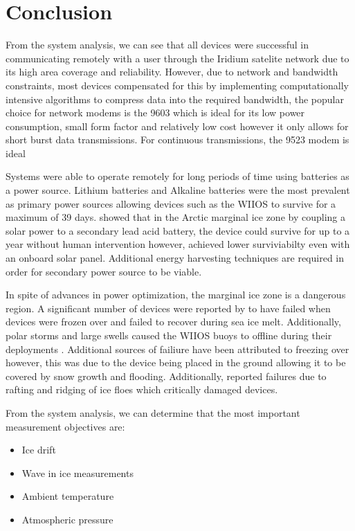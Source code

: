  
\section{Conclusion}

From the system analysis, we can see that all devices were successful in communicating remotely with a user through the Iridium satelite network due to its high area coverage and reliability. However, due to network and bandwidth constraints, most devices compensated for this by implementing computationally intensive algorithms to compress data into the required bandwidth, the popular choice for network modems is the 9603 which is ideal for its low power consumption, small form factor and relatively low cost however it only allows for short burst data transmissions. For continuous transmissions, the 9523 modem is ideal \par 

Systems were able to operate remotely for long periods of time using batteries as a power source. Lithium batteries and Alkaline batteries were the most prevalent as primary power sources allowing devices such as the WIIOS to survive for a maximum of 39 days. \textcite{doble2017robust} showed that in the Arctic marginal ice zone by coupling a solar power to a secondary lead acid battery, the device could survive for up to a year without human intervention however, \textcite{rabault2020development} achieved lower surviviabilty even with an onboard solar panel. Additional energy harvesting techniques are required in order for secondary power source to be viable. \par 

In spite of advances in power optimization, the marginal ice zone is a dangerous region. A significant number of devices were reported by \textcite{doble2017robust} to have failed when devices were frozen over and failed to recover during sea ice melt. Additionally, polar storms and large swells caused the WIIOS buoys to offline during their deployments \textcite{kohout2015device,alberello2019drift}. Additional sources of failiure have been attributed to freezing over \textcite{rabault2018investigation} however, this was due to the device being placed in the ground allowing it to be covered by snow growth \cite{barber2005microwave} and flooding. Additionally, \textcite{rabault2019open} reported failures due to rafting and ridging of ice floes which critically damaged devices.\par 

From the system analysis, we can determine that the most important measurement objectives are:
\begin{itemize}
	\item Ice drift
	\item Wave in ice measurements
	\item Ambient temperature
	\item Atmospheric pressure
\end{itemize}

